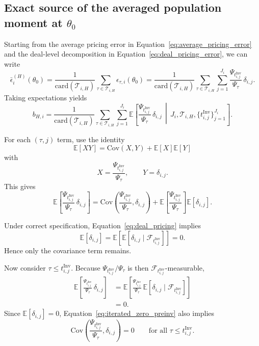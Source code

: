 \subsection{Exact source of the averaged population moment at $\theta_0$}
\label{sec:appendix_bv_moment_bias}

Starting from the average pricing error in Equation~\eqref{eq:average_pricing_error} and the deal-level decomposition in Equation~\eqref{eq:deal_pricing_error}, we can write
\begin{equation}
	\label{eq:avg_eps_expand}
	\bar{\epsilon}_i^{(H)}(\theta_0)
	=
	\frac{1}{\mathrm{card}(\mathcal{T}_{i,H})}
	\sum_{\tau\in\mathcal{T}_{i,H}}
	\epsilon_{\tau,i}(\theta_0)
	=
	\frac{1}{\mathrm{card}(\mathcal{T}_{i,H})}
	\sum_{\tau\in\mathcal{T}_{i,H}}
	\sum_{j=1}^{J_i}
	\frac{\Psi_{t_{i,j}^{\mathrm{Inv}}}}{\Psi_\tau}\,
	\delta_{i,j}.
\end{equation}
Taking expectations yields
\begin{equation}
	\label{eq:avg_eps_expectation}
	b_{H,i}
	=
	\frac{1}{\mathrm{card}(\mathcal{T}_{i,H})}
	\sum_{\tau\in\mathcal{T}_{i,H}}
	\sum_{j=1}^{J_i}
	\mathbb{E}\!\left[
	\frac{\Psi_{t_{i,j}^{\mathrm{Inv}}}}{\Psi_\tau}\,
	\delta_{i,j}
	\,\middle|\,
	J_i,\mathcal{T}_{i,H},\{t_{i,j}^{\mathrm{Inv}}\}_{j=1}^{J_i}
	\right].
\end{equation}

For each $(\tau,j)$ term, use the identity
\[
\mathbb{E}[XY]
=
\mathrm{Cov}(X,Y)+\mathbb{E}[X]\mathbb{E}[Y]
\]
with
\[
X=
\frac{\Psi_{t_{i,j}^{\mathrm{Inv}}}}{\Psi_\tau},
\qquad
Y=\delta_{i,j}.
\]
This gives
\begin{equation}
	\label{eq:cov_decomp}
	\mathbb{E}\!\left[
	\frac{\Psi_{t_{i,j}^{\mathrm{Inv}}}}{\Psi_\tau}\,
	\delta_{i,j}
	\right]
	=
	\mathrm{Cov}\!\left(
	\frac{\Psi_{t_{i,j}^{\mathrm{Inv}}}}{\Psi_\tau},
	\delta_{i,j}
	\right)
	+
	\mathbb{E}\!\left[
	\frac{\Psi_{t_{i,j}^{\mathrm{Inv}}}}{\Psi_\tau}
	\right]
	\mathbb{E}[\delta_{i,j}].
\end{equation}

Under correct specification, Equation~\eqref{eq:deal_pricing} implies
\[
\mathbb{E}[\delta_{i,j}]
=
\mathbb{E}\!\left[
\mathbb{E}[\delta_{i,j}\mid\mathcal{F}_{t_{i,j}^{\mathrm{Inv}}}]
\right]
=
0.
\]
Hence only the covariance term remains.

Now consider $\tau\le t_{i,j}^{\mathrm{Inv}}$.
Because $\Psi_{t_{i,j}^{\mathrm{Inv}}}/\Psi_\tau$ is then $\mathcal{F}_{t_{i,j}^{\mathrm{Inv}}}$-measurable,
\begin{align}
	\mathbb{E}\!\left[
	\frac{\Psi_{t_{i,j}^{\mathrm{Inv}}}}{\Psi_\tau}\,
	\delta_{i,j}
	\right]
	&=
	\mathbb{E}\!\left[
	\frac{\Psi_{t_{i,j}^{\mathrm{Inv}}}}{\Psi_\tau}\,
	\mathbb{E}\!\left[
	\delta_{i,j}\mid\mathcal{F}_{t_{i,j}^{\mathrm{Inv}}}
	\right]
	\right]
	\label{eq:iterated_zero_preinv}
	\\
	&=
	0.
	\nonumber
\end{align}
Since $\mathbb{E}[\delta_{i,j}]=0$, Equation~\eqref{eq:iterated_zero_preinv} also implies
\[
\mathrm{Cov}\!\left(
\frac{\Psi_{t_{i,j}^{\mathrm{Inv}}}}{\Psi_\tau},
\delta_{i,j}
\right)
=
0
\qquad
\text{for all }\tau\le t_{i,j}^{\mathrm{Inv}}.
\]

